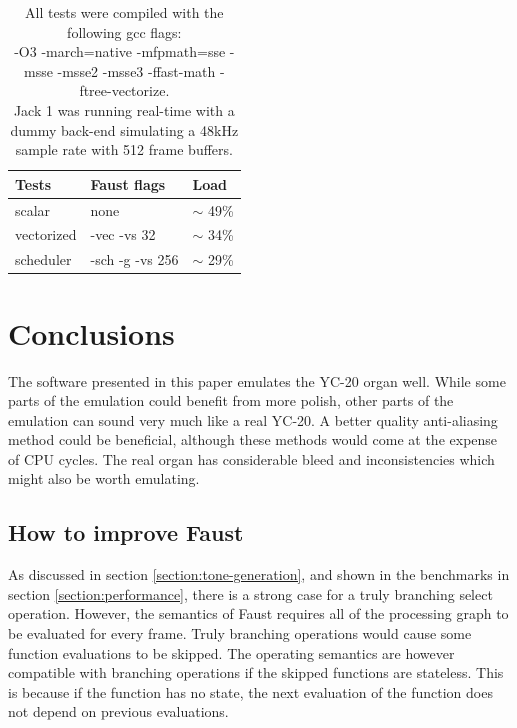 \documentclass[11pt,a4paper]{article}
\begin{document}


\begin{table}[h]
 \begin{center}
\begin{tabular}{|l|l|l|}

      \hline
      Tests         & Faust flags & Load   \\
      \hline\hline
      scalar        & none & $\sim$ 49\% \\
      vectorized    & -vec -vs 32 & $\sim$ 34\% \\
      scheduler     & -sch -g -vs 256 & $\sim$ 29\% \\
      \hline

\end{tabular}
\caption{All tests were compiled with the following gcc flags: \\
-O3 -march=native -mfpmath=sse -msse -msse2 -msse3 -ffast-math -ftree-vectorize. \\
Jack 1 was running real-time with a dummy back-end simulating a 48kHz sample rate with 512 frame buffers.
}\label{table:performance2}
 \end{center}
\end{table}



\section{Conclusions}

The software presented in this paper emulates the YC-20 organ well. While some parts of the emulation could benefit from more polish, other parts of the emulation can sound very much like a real YC-20. A better quality anti-aliasing method could be beneficial, although these methods would come at the expense of CPU cycles. The real organ has considerable bleed and inconsistencies which might also be worth emulating.

\subsection{How to improve Faust}

As discussed in section \ref{section:tone-generation}, and shown in the benchmarks in section \ref{section:performance}, there is a strong case for a truly branching select operation. However, the semantics of Faust requires all of the processing graph to be evaluated for every frame. Truly branching operations would cause some function evaluations to be skipped. The operating semantics are however compatible with branching operations if the skipped functions are stateless. This is because if the function has no state, the next evaluation of the function does not depend on previous evaluations.
\end{document}
